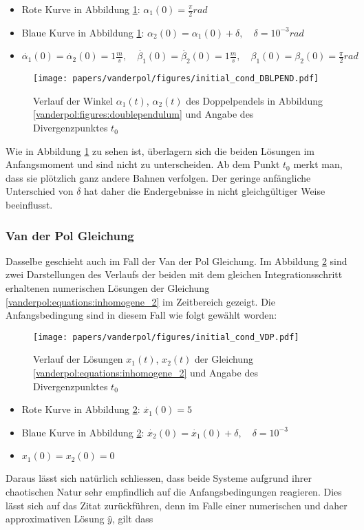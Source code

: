 \begin{itemize}
\item
Rote Kurve in Abbildung \ref{vanderpol:figures:init_cond_dbl_pend}: $\alpha_1(0) = \frac{\pi}{2}rad$
\item
Blaue Kurve in Abbildung \ref{vanderpol:figures:init_cond_dbl_pend}: $\alpha_2(0) = \alpha_1(0) + \delta, \quad \delta = 10^{-3}rad$
\item
$\dot{\alpha_1}(0) = \dot{\alpha_2}(0)= 1 \frac{m}{s}, \quad \dot{\beta_1}(0) = \dot{\beta_2}(0)= 1 \frac{m}{s}, \quad \beta_1(0)=\beta_2(0)=\displaystyle\frac{\pi}{2}rad$
\end{itemize}

\begin{figure}
\texttt{[image: papers/vanderpol/figures/initial\_cond\_DBLPEND.pdf]}
\caption{Verlauf der Winkel $\alpha_1(t)$, $\alpha_2(t)$ des Doppelpendels in Abbildung \ref{vanderpol:figures:doublependulum} und Angabe des Divergenzpunktes $t_0$\label{vanderpol:figures:init_cond_dbl_pend}}
\end{figure}
\noindent Wie in Abbildung \ref{vanderpol:figures:init_cond_dbl_pend} zu sehen ist, überlagern sich die beiden Lösungen im Anfangsmoment und sind nicht zu unterscheiden.
Ab dem Punkt $t_0$ merkt man, dass sie plötzlich ganz andere Bahnen verfolgen.
Der geringe anfängliche Unterschied von $\delta$ hat daher die Endergebnisse in nicht gleichgültiger Weise beeinflusst.
\subsubsection{Van der Pol Gleichung}
\label{vanderpol:subsubsection:vdp}
Dasselbe geschieht auch im Fall der Van der Pol Gleichung.
Im  Abbildung \ref{vanderpol:figures:init_cond_VDP} sind zwei Darstellungen des Verlaufs der beiden mit dem gleichen Integrationsschritt erhaltenen numerischen Lösungen der Gleichung \eqref{vanderpol:equations:inhomogene_2} im Zeitbereich gezeigt.
Die Anfangsbedingung sind in diesem Fall wie folgt gewählt worden:

\begin{figure}
\texttt{[image: papers/vanderpol/figures/initial\_cond\_VDP.pdf]}
\caption{Verlauf der Lösungen $x_1(t)$, $x_2(t)$ der Gleichung \eqref{vanderpol:equations:inhomogene_2} und Angabe des Divergenzpunktes $t_0$ \label{vanderpol:figures:init_cond_VDP}}
\end{figure}

\begin{itemize}
\item
Rote Kurve in Abbildung \ref{vanderpol:figures:init_cond_VDP}: $\dot{x_1}(0) = 5$
\item
Blaue Kurve in Abbildung \ref{vanderpol:figures:init_cond_VDP}: $\dot{x_2}(0) = \dot{x_1}(0) + \delta, \quad \delta = 10^{-3}$ 
\item
$x_1(0) = x_2(0) = 0$
\end{itemize}
Daraus lässt sich natürlich schliessen, dass beide Systeme aufgrund ihrer chaotischen Natur sehr empfindlich auf die Anfangsbedingungen reagieren.
Dies lässt sich auf das Zitat zurückführen, denn im Falle einer numerischen und daher approximativen Lösung $\hat{y}$, gilt dass

